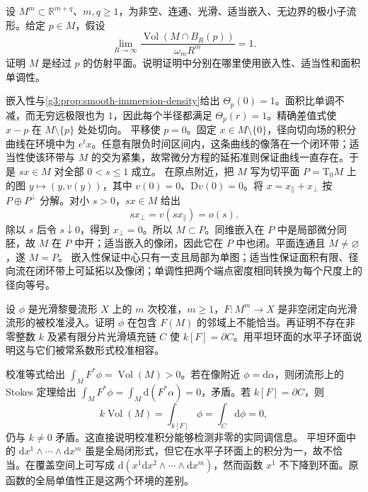 \begin{exercise}\label{g3:ex:unit-density-at-infinity-plane}
	设 \(M^m\subset\mathbb R^{m+q}\)、\(m,q\ge1\)，为非空、连通、光滑、适当嵌入、无边界的极小子流形。给定 \(p\in M\)，假设
	\[
		\lim_{R\to\infty}\frac{\operatorname{Vol}(M\cap B_R(p))}{\omega_mR^m}=1.
	\]
	证明 \(M\) 是经过 \(p\) 的仿射平面。说明证明中分别在哪里使用嵌入性、适当性和面积单调性。
\end{exercise}
\begin{solution}
	嵌入性与\cref{g3:prop:smooth-immersion-density}给出 \(\Theta_p(0)=1\)。面积比单调不减，而无穷远极限也为 \(1\)，因此每个半径都满足 \(\Theta_p(r)=1\)。精确差值式使 \(x-p\) 在 \(M\setminus\{p\}\) 处处切向。
	平移使 \(p=0\)。固定 \(x\in M\setminus\{0\}\)，径向切向场的积分曲线在环境中为 \(e^t x\)。任意有限负时间区间内，这条曲线的像落在一个闭环带；适当性使该环带与 \(M\) 的交为紧集，故常微分方程的延拓准则保证曲线一直存在。于是 \(sx\in M\) 对全部 \(0<s\le1\) 成立。
	在原点附近，把 \(M\) 写为切平面 \(P=\mathrm T_0M\) 上的图 \(y\mapsto(y,v(y))\)，其中 \(v(0)=0\)、\(\mathrm Dv(0)=0\)。将 \(x=x_\parallel+x_\perp\) 按 \(P\oplus P^\perp\) 分解。对小 \(s>0\)，\(sx\in M\) 给出
	\[
		sx_\perp=v(sx_\parallel)=o(s).
	\]
	除以 \(s\) 后令 \(s\downarrow0\)，得到 \(x_\perp=0\)。所以 \(M\subset P\)。同维嵌入在 \(P\) 中是局部微分同胚，故 \(M\) 在 \(P\) 中开；适当嵌入的像闭，因此它在 \(P\) 中也闭。平面连通且 \(M\ne\varnothing\)，遂 \(M=P\)。
	嵌入性保证中心只有一支且局部为单图；适当性保证面积有限、径向流在闭环带上可延拓以及像闭；单调性把两个端点密度相同转换为每个尺度上的径向等号。
\end{solution}

\begin{exercise}\label{g3:ex:calibration-topological-obstruction}
	设 \(\phi\) 是光滑黎曼流形 \(X\) 上的 \(m\) 次校准，\(m\ge1\)，\(F:M^m\to X\) 是非空闭定向光滑流形的被校准浸入。证明 \(\phi\) 在包含 \(F(M)\) 的邻域上不能恰当。再证明不存在非零整数 \(k\) 及紧有限分片光滑填充链 \(C\) 使 \(k[F]=\partial C\)。用平坦环面的水平子环面说明这与它们被常系数形式校准相容。
\end{exercise}
\begin{solution}
	校准等式给出 \(\int_MF^*\phi=\operatorname{Vol}(M)>0\)。若在像附近 \(\phi=\mathrm d\alpha\)，则闭流形上的 Stokes 定理给出
	\(\int_MF^*\phi=\int_M\mathrm d(F^*\alpha)=0\)，矛盾。若 \(k[F]=\partial C\)，则
	\[
		k\operatorname{Vol}(M)=\int_{k[F]}\phi=\int_C\mathrm d\phi=0,
	\]
	仍与 \(k\ne0\) 矛盾。这直接说明校准积分能够检测非零的实同调信息。
	平坦环面中的 \(\mathrm dx^1\wedge\cdots\wedge\mathrm dx^m\) 虽是全局闭形式，但它在水平子环面上的积分为一，故不恰当。在覆盖空间上可写成 \(\mathrm d(x^1\mathrm dx^2\wedge\cdots\wedge\mathrm dx^m)\)，然而函数 \(x^1\) 不下降到环面。原函数的全局单值性正是这两个环境的差别。
\end{solution}

